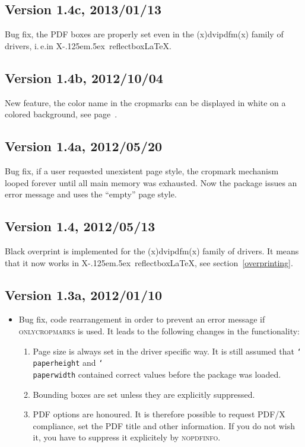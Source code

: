 \documentclass[11pt]{article}
\def\opt#1{\texorpdfstring{\textmd{\textsc{#1}}}{#1}}
\DeclareRobustCommand\cmd[1]{\texttt{\char`\\#1}}
\DeclareRobustCommand\XeLaTeX{X\kern-.125em\lower.5ex\hbox{\csname
              reflectbox\endcsname{E}}\LaTeX}
\let\zwcomma\,
\def\,{\texorpdfstring{\zwcomma}{}}
\begin{document}
\subsection{Version 1.4c, 2013/01/13}
Bug fix, the PDF boxes are properly set even in the (x)dvipdfm(x) family of drivers, i.\,e.\@ in
\XeLaTeX.

\subsection{Version 1.4b, 2012/10/04}
New feature, the color name in the cropmarks can be displayed in white on a colored background, see
page~\pageref{color}.

\subsection{Version 1.4a, 2012/05/20}
Bug fix, if a user requested unexistent page style, the cropmark mechanism looped forever until all
main memory was exhausted. Now the package issues an error message and uses the ``empty'' page
style.

\subsection{Version 1.4, 2012/05/13}
Black overprint is implemented for the (x)dvipdfm(x) family of drivers. It means that it now works
in \XeLaTeX, see section~\ref{overprinting}.

\subsection{Version 1.3a, 2012/01/10}
\begin{itemize}
\item Bug fix, code rearrangement in order to prevent an error message if \opt{onlycropmarks} is
used. It leads to the following changes in the functionality:
\begin{enumerate}
\item Page size is always set in the driver specific way. It is still assumed that
\cmd{paperheight} and \cmd{paperwidth} contained correct values before the package was loaded.
\item Bounding boxes are set unless they are explicitly suppressed.
\item PDF options are honoured. It is therefore possible to request PDF/X compliance, set the PDF
title and other information. If you do not wish it, you have to suppress it explicitely by
\opt{nopdfinfo}.
\end{enumerate}
\end{itemize}
\end{document}
